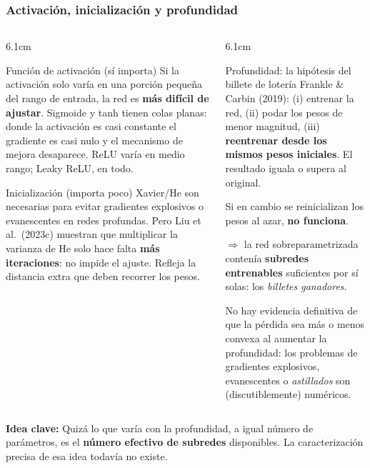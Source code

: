 \documentclass[aspectratio=169, 10pt]{beamer}
\newcommand{\idea}[1]{%
	\begin{tcolorbox}[colback=AccentGreen!6, colframe=AccentGreen, arc=3pt,
		width=\textwidth, boxsep=1pt, left=5pt, right=5pt, top=2pt, bottom=2pt,
		fontupper=\small]
		\RaggedRight\textbf{Idea clave:} #1
	\end{tcolorbox}
}
\begin{document}
\begin{frame}
\frametitle{Activación, inicialización y profundidad}
\scriptsize %
\begin{columns}[T]
\begin{column}{6.1cm}
\begin{block}{Función de activación (sí importa)}
Si la activaci\'on solo var\'ia en una porci\'on peque\~na del rango de entrada, la red es \textbf{m\'as dif\'icil de ajustar}. Sigmoide y tanh tienen colas planas: donde la activaci\'on es casi constante el gradiente es casi nulo y el mecanismo de mejora desaparece. ReLU var\'ia en medio rango; Leaky ReLU, en todo.
\end{block}
\begin{block}{Inicialización (importa poco)}
Xavier/He son necesarias para evitar gradientes explosivos o evanescentes en redes profundas. Pero Liu et al.\ (2023c) muestran que multiplicar la varianza de He solo hace falta \textbf{m\'as iteraciones}: no impide el ajuste. Refleja la distancia extra que deben recorrer los pesos.
\end{block}
\end{column}
\begin{column}{6.1cm}
\begin{alertblock}{Profundidad: la hipótesis del billete de lotería}
Frankle \& Carbin (2019): (i) entrenar la red, (ii) podar los pesos de menor magnitud, (iii) \textbf{reentrenar desde los mismos pesos iniciales}. El resultado iguala o supera al original.
\vspace{0.3em}

Si en cambio se reinicializan los pesos al azar, \textbf{no funciona}.
\vspace{0.3em}

$\Rightarrow$ la red sobreparametrizada conten\'ia \textbf{subredes entrenables} suficientes por s\'i solas: los \emph{billetes ganadores}.
\end{alertblock}
\vspace{0.2em}
No hay evidencia definitiva de que la p\'erdida sea m\'as o menos convexa al aumentar la profundidad: los problemas de gradientes explosivos, evanescentes o \emph{astillados} son (discutiblemente) num\'ericos.
\end{column}
\end{columns}
\vspace{0.2em}
\idea{Quiz\'a lo que var\'ia con la profundidad, a igual n\'umero de par\'ametros, es el \textbf{n\'umero efectivo de subredes} disponibles. La caracterizaci\'on precisa de esa idea todav\'ia no existe.}
\end{frame}
\end{document}
